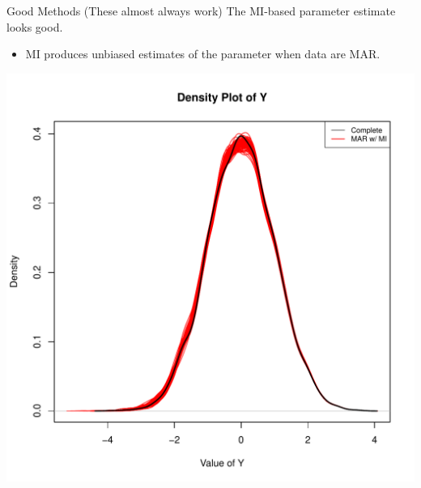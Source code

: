 \documentclass{beamer}\usepackage[]{graphicx}\usepackage[]{color}
\newenvironment{knitrout}{}{} %
\begin{document}
\begin{frame}{Good Methods (These almost always 
    work)}
The MI-based parameter estimate looks good.
\begin{itemize}
\item MI produces unbiased estimates of the parameter when data are MAR.
\end{itemize}

\pagebreak

\begin{knitrout}\footnotesize
{}\color{fgcolor}

{\centering \includegraphics[width=0.65\linewidth]{figure/intro-unnamed-chunk-28-1} 

}


\end{knitrout}

\end{frame}

\end{document}
